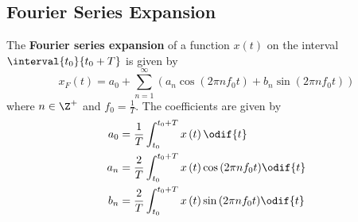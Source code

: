 \documentclass{article}
\begin{document}
\subsection{Fourier Series Expansion}
The \textbf{Fourier series expansion} of a function \(x\left( t
\right)\) on the interval \(\interval{t_0}{t_0 + T}\) is given by
\begin{equation*}
    x_F\left( t \right) = a_0 + \sum_{n = 1}^\infty \left( a_n \cos{\left( 2\pi n f_0 t \right)} + b_n \sin{\left( 2\pi n f_0 t \right)} \right)
\end{equation*}
where \(n \in \Z^{+}\) and \(f_0 = \frac{1}{T}\). The coefficients are given by
\begin{align*}
    a_0 & = \frac{1}{T} \int_{t_0}^{t_0 + T} x\left( t \right) \odif{t}                                   \\
    a_n & = \frac{2}{T} \int_{t_0}^{t_0 + T} x\left( t \right) \cos{\left( 2\pi n f_0 t \right)} \odif{t} \\
    b_n & = \frac{2}{T} \int_{t_0}^{t_0 + T} x\left( t \right) \sin{\left( 2\pi n f_0 t \right)} \odif{t}
\end{align*}
\end{document}
